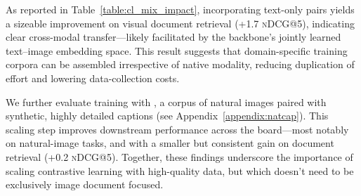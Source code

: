 As reported in Table~\ref{table:cl_mix_impact}, incorporating text-only pairs yields a sizeable improvement on visual document retrieval (+1.7 \textsc{nDCG}@5), indicating clear cross-modal transfer—likely facilitated by the backbone’s jointly learned text–image embedding space. This result suggests that domain-specific training corpora can be assembled irrespective of native modality, reducing duplication of effort and lowering data-collection costs.

We further evaluate training with \natcap{}, a corpus of natural images paired with synthetic, highly detailed captions (see Appendix~\ref{appendix:natcap}). This scaling step improves downstream performance across the board—most notably on natural-image tasks, and with a smaller but consistent gain on document retrieval (+0.2 \textsc{nDCG}@5). Together, these findings underscore the importance of scaling contrastive learning with high-quality data, but which doesn't need to be exclusively image document focused.





